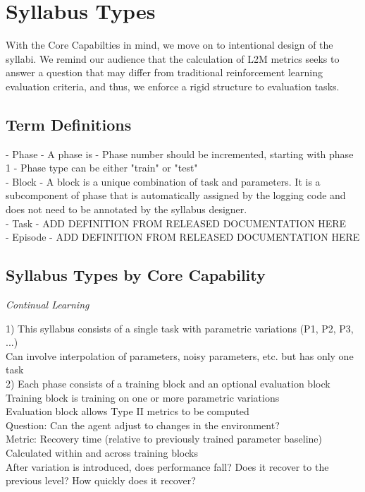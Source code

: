 \chapter{Syllabus Types}\label{ch:syllabus_and_metric_types}

With the Core Capabilties in mind, we move on to intentional design of the syllabi. We remind our audience that the calculation of L2M metrics seeks to answer a question that may differ from traditional reinforcement learning evaluation criteria, and thus, we enforce a rigid structure to evaluation tasks.

\section{Term Definitions}

- Phase
    - A phase is
    - Phase number should be incremented, starting with phase 1
    - Phase type can be either "train" or "test"\\
- Block
    - A block is a unique combination of task and parameters. It is a subcomponent of phase that is automatically assigned by the logging code and does not need to be annotated by the syllabus designer.\\
- Task
    - ADD DEFINITION FROM RELEASED DOCUMENTATION HERE\\
- Episode
    - ADD DEFINITION FROM RELEASED DOCUMENTATION HERE\\
    
\section{Syllabus Types by Core Capability} 


\textit{Continual Learning}

    1) This syllabus consists of a single task with parametric variations (P1, P2, P3, ...)\\
        Can involve interpolation of parameters, noisy parameters, etc. but has only one task\\
    2) Each phase consists of a training block and an optional evaluation block\\
        Training block is training on one or more parametric variations \\
        Evaluation block allows Type II metrics to be computed\\
        
    Question: Can the agent adjust to changes in the environment?\\
        Metric: Recovery time (relative to previously trained parameter baseline)\\
            Calculated within and across training blocks \\
            After variation is introduced, does performance fall? Does it recover to the previous level? How quickly does it recover?\\
    

